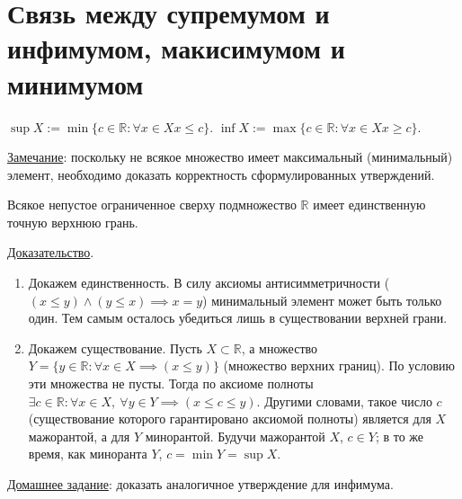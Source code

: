\documentclass{article}
\begin{document}
    \section{Связь между супремумом и инфимумом, макисимумом и минимумом}
    \begin{claim}
        \(\sup{X} := \min\{c \in \mathbb{R}: \forall x \in X x \leq c\}\).
        \(\inf{X} := \max\{c \in \mathbb{R}: \forall x \in X x \geq c\}\).
    \end{claim}
    \underline{Замечание}: поскольку не всякое множество имеет максимальный (минимальный) элемент,
    необходимо доказать корректность сформулированных утверждений.
    \begin{theorem}
        Всякое непустое ограниченное сверху подмножество \(\mathbb{R}\) имеет единственную точную верхнюю грань. 
    \end{theorem}
    \noindent
    \underline{Доказательство}.
    \begin{enumerate}
        \item Докажем единственность. В силу аксиомы антисимметричности (\((x \leq y) \land (y \leq x) \implies x = y\)) минимальный элемент может быть только один. 
        Тем самым осталось убедиться лишь в существовании верхней грани.
        \item Докажем существование. Пусть \(X \subset \mathbb{R}\), а множество \(Y = \{ y \in \mathbb{R}: \forall x \in X \implies (x \leq y)\}\) (множество верхних границ).
        По условию эти множества не пусты. Тогда по аксиоме полноты \(\exists c \in \mathbb{R}: \forall x \in X,\ \forall y \in Y \implies (x \leq c \leq y)\). Другими словами, такое число \(c\) (существование которого гарантировано аксиомой полноты) является для \(X\) мажорантой, а для \(Y\) минорантой. 
        Будучи мажорантой \(X\), \(c \in Y\); в то же время, как миноранта \(Y\), \(c = \min{Y} = \sup{X}\).
    \end{enumerate}
    \noindent
    \underline{Домашнее задание}: доказать аналогичное утверждение для инфимума.
\end{document}
